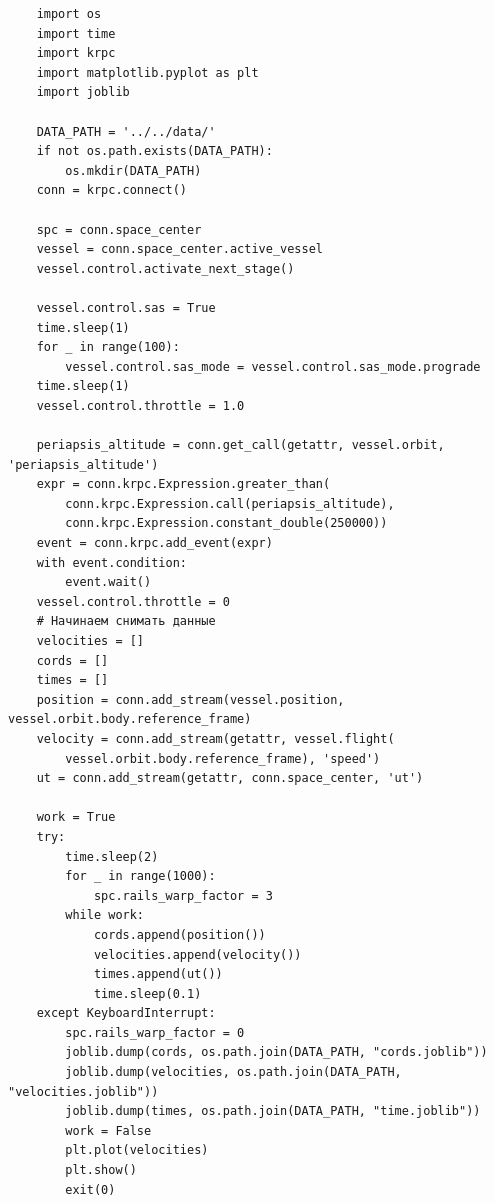 \documentclass{article}
\begin{document}
     \begin{verbatim}
    import os
    import time
    import krpc
    import matplotlib.pyplot as plt
    import joblib
    
    DATA_PATH = '../../data/'
    if not os.path.exists(DATA_PATH):
        os.mkdir(DATA_PATH)
    conn = krpc.connect()
    
    spc = conn.space_center
    vessel = conn.space_center.active_vessel
    vessel.control.activate_next_stage()
    
    vessel.control.sas = True
    time.sleep(1)
    for _ in range(100):
        vessel.control.sas_mode = vessel.control.sas_mode.prograde
    time.sleep(1)
    vessel.control.throttle = 1.0
    
    periapsis_altitude = conn.get_call(getattr, vessel.orbit, 'periapsis_altitude')
    expr = conn.krpc.Expression.greater_than(
        conn.krpc.Expression.call(periapsis_altitude),
        conn.krpc.Expression.constant_double(250000))
    event = conn.krpc.add_event(expr)
    with event.condition:
        event.wait()
    vessel.control.throttle = 0
    # Начинаем снимать данные
    velocities = []
    cords = []
    times = []
    position = conn.add_stream(vessel.position, vessel.orbit.body.reference_frame)
    velocity = conn.add_stream(getattr, vessel.flight(
        vessel.orbit.body.reference_frame), 'speed')
    ut = conn.add_stream(getattr, conn.space_center, 'ut')
    
    work = True
    try:
        time.sleep(2)
        for _ in range(1000):
            spc.rails_warp_factor = 3
        while work:
            cords.append(position())
            velocities.append(velocity())
            times.append(ut())
            time.sleep(0.1)
    except KeyboardInterrupt:
        spc.rails_warp_factor = 0
        joblib.dump(cords, os.path.join(DATA_PATH, "cords.joblib"))
        joblib.dump(velocities, os.path.join(DATA_PATH, "velocities.joblib"))
        joblib.dump(times, os.path.join(DATA_PATH, "time.joblib"))
        work = False
        plt.plot(velocities)
        plt.show()
        exit(0)

     \end{verbatim}
\end{document}
